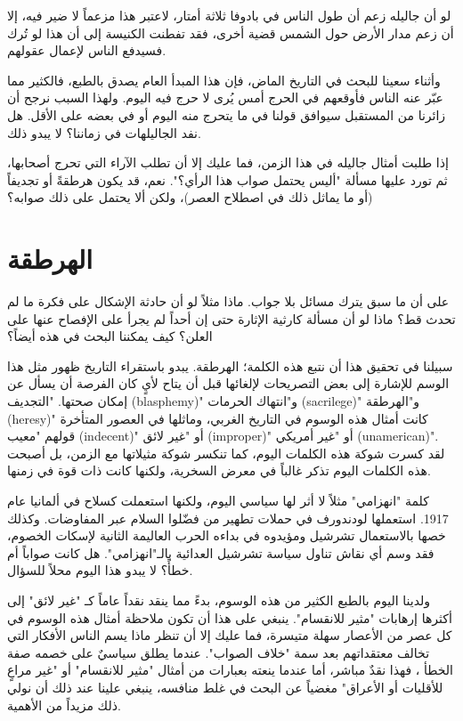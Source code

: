 \documentclass[a4paper]{article}%
\begin{document}
لو أن جاليله زعم أن طول الناس في بادوفا ثلاثة أمتار، لاعتبر هذا مزعماً لا ضير
فيه، إلا أن زعم مدار الأرض حول الشمس قضية أخرى، فقد تفطنت الكنيسة إلى أن هذا لو
تُرك فسيدفع الناس لإعمال عقولهم.

وأثناء سعينا للبحث في التاريخ الماض، فإن هذا المبدأ العام يصدق بالطبع، فالكثير
مما عبّر عنه الناس فأوقعهم في الحرج أمس يُرى لا حرج فيه اليوم. ولهذا السبب نرجح أن
زائرنا من المستقبل سيوافق قولنا في ما يتحرج منه اليوم أو في بعضه على الأقل. هل
نفد الجاليلهات في زماننا؟ لا يبدو ذلك.

إذا طلبت أمثال جاليله في هذا الزمن، فما عليك إلا أن تطلب الآراء التي تحرج
أصحابها، ثم تورد عليها مسألة "أليس يحتمل صواب هذا الرأي؟". نعم، قد يكون هرطقةً أو
تجديفاً (أو ما يماثل ذلك في اصطلاح العصر)، ولكن ألا يحتمل على ذلك صوابه؟

\section{الهرطقة}

على أن ما سبق يترك مسائل بلا جواب. ماذا مثلاً لو أن حادثة الإشكال على فكرة ما لم
تحدث قط؟ ماذا لو أن مسألة كارثية الإثارة حتى إن أحداً لم يجرأ على الإفصاح عنها
على العلن؟ كيف يمكننا البحث في هذه أيضاً؟

سبيلنا في تحقيق هذا أن نتبع هذه الكلمة؛ الهرطقة. يبدو باستقراء التاريخ ظهور مثل
هذا الوسم للإشارة إلى بعض التصريحات لإلغائها قبل أن يتاح لأيٍ كان الفرصة أن يسأل
عن إمكان صحتها. "التجديف (blasphemy)" و"انتهاك الحرمات (sacrilege)" و"الهرطقة
(heresy)" كانت أمثال هذه الوسوم في التاريخ الغربي، وماثلها في العصور المتأخرة
قولهم "معيب (indecent)" أو "غير لائق (improper)" أو "غير أمريكي (unamerican)".
لقد كسرت شوكة هذه الكلمات اليوم، كما تنكسر شوكة مثيلاتها مع الزمن، بل أصبحت هذه
الكلمات اليوم تذكر غالباً في معرض السخرية، ولكنها كانت ذات قوة في زمنها.

كلمة "انهزامي" مثلاً لا أثر لها سياسي اليوم، ولكنها استعملت كسلاح في ألمانيا
عام 1917. استعملها لودندورف في حملات تطهير من فضّلوا السلام عبر المفاوضات. وكذلك
خصها بالاستعمال تشرشيل ومؤيدوه في بداءه الحرب العاليمة الثانية لإسكات الخصوم،
فقد وسم أي نقاش تناول سياسة تشرشيل العدائية بالـ"انهزامي". هل كانت صواباً أم خطأً؟
لا يبدو هذا اليوم محلاً للسؤال.

ولدينا اليوم بالطبع الكثير من هذه الوسوم، بدءً مما ينقد نقداً عاماً كـ "غير لائق"
إلى أكثرها إرهابات "مثير للانقسام". ينبغي على هذا أن تكون ملاحظة أمثال هذه
الوسوم في كل عصر من الأعصار سهلة متيسرة، فما عليك إلا أن تنظر ماذا يسم الناس
الأفكار التي تخالف معتقداتهم بعد سمة "خلاف الصواب". عندما يطلق سياسيٌ على خصمه
صفة الخطأ ، فهذا نقدٌ مباشر، أما عندما ينعته بعبارات من أمثال "مثير للانقسام" أو
"غير مراعٍ للأقليات أو الأعراق" مغضياً عن البحث في غلط منافسه، ينبغي علينا عند ذلك
أن نولي ذلك مزيداً من الأهمية.
\end{document}
